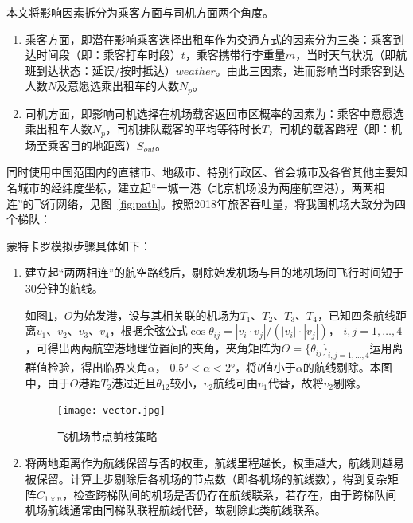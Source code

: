 本文将影响因素拆分为乘客方面与司机方面两个角度。

\begin{enumerate}[label=(\arabic*)]
    \item 乘客方面，即潜在影响乘客选择出租车作为交通方式的因素分为三类：乘客到达时间段（即：乘客打车时段）$t$，乘客携带行李重量$m$，当时天气状况（即航班到达状态：延误/按时抵达）$weather$。由此三因素，进而影响当时乘客到达人数$N$及意愿选乘出租车的人数$N_p$。

    \item 司机方面，即影响司机选择在机场载客返回市区概率的因素为：乘客中意愿选乘出租车人数$N_p$，司机排队载客的平均等待时长$T$，司机的载客路程（即：机场至乘客目的地距离）$S_{out}$。
\end{enumerate}

同时使用中国范围内的直辖市、地级市、特别行政区、省会城市及各省其他主要知名城市的经纬度坐标，建立起``一城一港（北京机场设为两座航空港），两两相连''的飞行网络，见图~\ref{fig:path}。按照2018年旅客吞吐量，将我国机场大致分为四个梯队：

\begin{table}
    \centering
    \caption{中国机场分级依据}\label{T:classify_1}
\end{table}

蒙特卡罗模拟步骤具体如下：

\begin{enumerate}[label=(\arabic*)]
    \item 建立起“两两相连”的航空路线后，剔除始发机场与目的地机场间飞行时间短于30分钟的航线。
    
    如图\ref{fig:vector}，$O$为始发港，设与其相关联的机场为$T_1$、$T_2$、$T_3$、$T_4$，已知四条航线距离$v_1$、$v_2$、$v_3$、$v_4$，根据余弦公式$\cos \theta_{ij} = |v_i\cdot v_j|/\left(|v_i|\cdot|v_j|\right)$， $i,j=1,\ldots,4$，可得出两两航空港地理位置间的夹角，夹角矩阵为$\Theta=\{\theta_{ij}\}_{i,j=1,\ldots,4} $运用离群值检验，得出临界夹角$\alpha$， $\ang{0.5}<\alpha<\ang{2}$，将$\theta$值小于$\alpha$的航线剔除。本图中，由于$O$港距$T_2$港过近且$\theta_{12}$较小，$v_2$航线可由$v_1$代替，故将$v_2$剔除。

\begin{figure}
    \centering
    \texttt{[image: vector.jpg]}
    \caption{飞机场节点剪枝策略}\label{fig:vector}
\end{figure}

    \item 将两地距离作为航线保留与否的权重，航线里程越长，权重越大，航线则越易被保留。计算上步剔除后各机场的节点数（即各机场的航线数），得到复杂矩阵$C_{1\times n}$，检查跨梯队间的机场是否仍存在航线联系，若存在，由于跨梯队间机场航线通常由同梯队联程航线代替，故剔除此类航线联系。
\end{enumerate}

